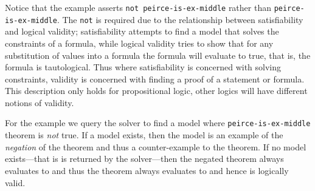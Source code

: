 Notice that the example asserts \lstinline{not peirce-is-ex-middle} rather than
\lstinline{peirce-is-ex-middle}. The \lstinline{not} is required due to the
relationship between satisfiability and logical validity; satisfiability
attempts to find a model that solves the constraints of a formula, while logical
validity tries to show that for any substitution of values into a formula the
formula will evaluate to true, that is, the formula is tautological. Thus where
satisfiability is concerned with solving constraints, validity is concerned with
finding a proof of a statement or formula. This description only holds for
propositional logic, other logics will have different notions of validity.

For the example we query the solver to find a model where
\lstinline{peirce-is-ex-middle} theorem is \emph{not} true. If a model exists,
then the model is an example of the \emph{negation} of the theorem and thus a
counter-example to the theorem. If no model exists---that is  is
returned by the solver---then the negated theorem always evaluates to \fls{} and
thus the theorem always evaluates to \tru{} and hence is logically valid.

%

